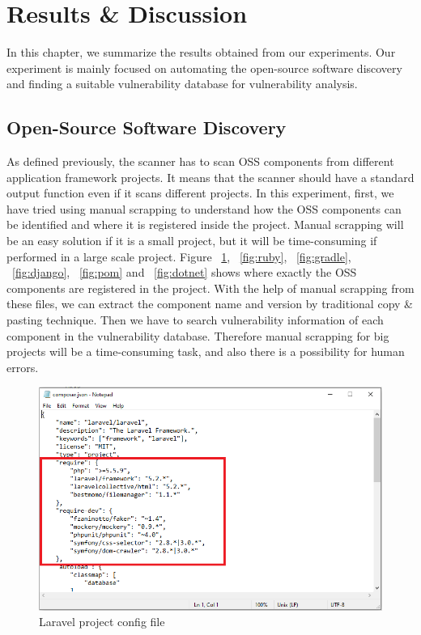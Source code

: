 %
\section{Results \& Discussion}\label{sec:Results & Discussion}
%
In this chapter, we summarize the results obtained from our experiments. Our experiment is mainly focused on automating the open-source software discovery and finding a suitable vulnerability database for vulnerability analysis.

\subsection{Open-Source Software Discovery}
As defined previously, the scanner has to scan \acs{OSS} components from different application framework projects. It means that the scanner should have a standard output function even if it scans different projects. In this experiment, first, we have tried using manual scrapping to understand how the \acs{OSS} components can be identified and where it is registered inside the project. Manual scrapping will be an easy solution if it is a small project, but it will be time-consuming if performed in a large scale project. Figure ~\ref{fig:laravel}, ~\ref{fig:ruby}, ~\ref{fig:gradle}, ~\ref{fig:django}, ~\ref{fig:pom} and ~\ref{fig:dotnet} shows where exactly the OSS components are registered in the project. With the help of manual scrapping from these files, we can extract the component name and version by traditional copy \& pasting technique. Then we have to search vulnerability information of each component in the vulnerability database. Therefore manual scrapping for big projects will be a time-consuming task, and also there is a possibility for human errors.
\begin{figure}[h!]
	\includegraphics[width=15cm]{includes/laravel.PNG}
	\centering
	\caption{Laravel project config file}
	\label{fig:laravel}
\end{figure}
